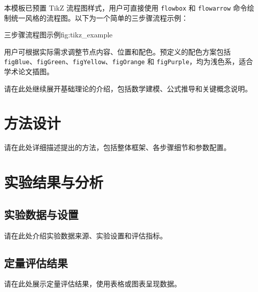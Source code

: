 \documentclass[supercite]{HustGraduPaper}
\begin{document}
	本模板已预置 TikZ 流程图样式，用户可直接使用 \verb|flowbox| 和 \verb|flowarrow| 命令绘制统一风格的流程图。以下为一个简单的三步骤流程示例：
	
	\begin{generalfig}[htb]{三步骤流程图示例}{fig:tikz_example}
		\centering
	\end{generalfig}
	
	用户可根据实际需求调整节点内容、位置和配色。预定义的配色方案包括 \verb|figBlue|、\verb|figGreen|、\verb|figYellow|、\verb|figOrange| 和 \verb|figPurple|，均为浅色系，适合学术论文插图。
	
	请在此处继续展开基础理论的介绍，包括数学建模、公式推导和关键概念说明。
	
	\section{方法设计}
	
	请在此处详细描述提出的方法，包括整体框架、各步骤细节和参数配置。
	
	\section{实验结果与分析}
	
	\subsection{实验数据与设置}
	
	请在此处介绍实验数据来源、实验设置和评估指标。
	
	\subsection{定量评估结果}
	
	请在此处展示定量评估结果，使用表格或图表呈现数据。
	
\end{document}
